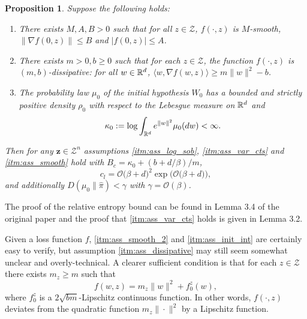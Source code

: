 \documentclass{article}
\makeatletter
\newtheorem{proposition}[theorem]{Proposition}
\def\namedlabel#1#2{\begingroup
    #2%
    \def\@currentlabel{#2}%
    \label{#1}\endgroup
}
\newcommand{\Bbf}[1]{\mathbf{#1}}
\newcommand{\Bcal}[1]{\mathcal{#1}}
\makeatother
\begin{document}
\begin{proposition}\label{prop:nicer_assumptions}
Suppose the following holds:
\begin{enumerate}
    \item[\namedlabel{itm:ass_smooth_2}{(A.1)}] There exists \(M, A, B > 0\) such that for all \(z \in \Bcal{Z}\), \(f(\cdot, z)\) is \(M\)-smooth, \(\|\nabla f(0, z)\| \leq B\) and \(|f(0, z)| \leq A\).
    \item[\namedlabel{itm:ass_dissipative}{(A.2)}] There exists \(m > 0, b \geq 0\) such that for each \(z \in \Bcal{Z}\), the function \(f(\cdot, z)\) is \((m, b)\)-dissipative: for all \(w \in \Bbb{R}^d\), \(\langle w, \nabla f(w, z) \rangle \geq m \|w\|^2 - b\).
    \item[\namedlabel{itm:ass_init_int}{(A.3)}] The probability law \(\mu_0\) of the initial hypothesis \(W_0\) has a bounded and strictly positive density \(\rho_0\) with respect to the Lebesgue measure on \(\Bbb{R}^d\) and
    \begin{equation*}
        \kappa_0 := \log \int _{\Bbb{R}^d} e^{\|w\|^2} \mu_0(dw) < \infty.
    \end{equation*}
\end{enumerate}
Then for any \(\Bbf{z} \in \Bcal{Z}^n\) assumptions \ref{itm:ass_log_sob}, \ref{itm:ass_var_cts} and \ref{itm:ass_smooth} hold with \(B_c = \kappa_0 + (b + d/\beta)/m\),
\begin{equation}\label{eq:nicer_assumptions_1}
    c_l = \Bcal{O} \big ( \beta + d \big )^2 \exp(\Bcal{O} \big ( \beta + d \big ) \big ),
\end{equation}
and additionally \(D(\mu_0 \| \hat{\pi}) < \gamma\) with \(\gamma = \Bcal{O} (\beta)\).
\end{proposition}
The proof of the relative entropy bound can be found in Lemma 3.4 of the original paper and the proof that \ref{itm:ass_var_cts} holds is given in Lemma 3.2.

Given a loss function \(f\), \ref{itm:ass_smooth_2} and \ref{itm:ass_init_int} are certainly easy to verify, but assumption \ref{itm:ass_dissipative} may still seem somewhat unclear and overly-technical. A clearer sufficient condition is that for each \(z \in \Bcal{Z}\) there exists \(m_z \geq m\) such that
\begin{equation*}
    f(w, z) = m_z \|w\|^2 + f_0^z(w),
\end{equation*}
where \(f_0^z\) is a \(2\sqrt{bm}\)-Lipschitz continuous function. In other words, \(f(\cdot, z)\) deviates from the quadratic function \(m_z \|\cdot\|^2\) by a Lipschitz function.
\end{document}
